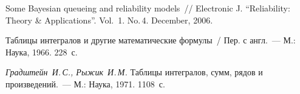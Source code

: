 \begin{multicols}{2}
{{\begin{thebibliography}{9}
Some Bayesian queueing and reliability models~// 
Electronic J. ``Reliability: Theory \& Applications''. Vol.\ 1. No.\,4. 
December, 2006.

Таблицы интегралов и другие математические формулы~/ Пер. с англ.~---  
М.: Наука, 1966. 228~с.

\textit{Градштейн~И.\,С., Рыжик~И.\,М.}
Таблицы интегралов, сумм, рядов и произведений.~---  М.: Наука, 1971.  1108~с.


\end{thebibliography}

}
}

\end{multicols}


\label{end\stat}